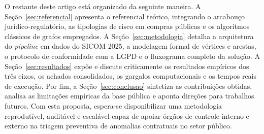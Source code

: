 O restante deste artigo está organizado da seguinte maneira. A Seção~\ref{sec:referencial} apresenta o referencial teórico, integrando o arcabouço jurídico-regulatório, as tipologias de risco em compras públicas e os algoritmos clássicos de grafos empregados. A Seção~\ref{sec:metodologia} detalha a arquitetura do \textit{pipeline} em dados do SICOM 2025, a modelagem formal de vértices e arestas, o protocolo de conformidade com a LGPD e o fluxograma completo da solução. A Seção~\ref{sec:resultados} expõe e discute criticamente os resultados empíricos dos três eixos, os achados consolidados, os gargalos computacionais e os tempos reais de execução. Por fim, a Seção~\ref{sec:conclusao} sintetiza as contribuições obtidas, analisa as limitações empíricas da base pública e aponta direções para trabalhos futuros. Com esta proposta, espera-se disponibilizar uma metodologia reprodutível, auditável e escalável capaz de apoiar órgãos de controle interno e externo na triagem preventiva de anomalias contratuais no setor público.
